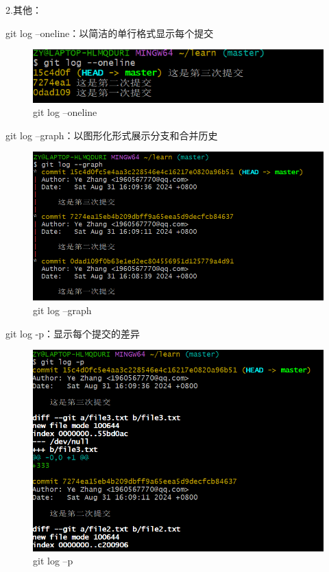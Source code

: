 \documentclass{ctexart}
\begin{document}
	2.其他：
	
	git log --oneline：以简洁的单行格式显示每个提交
	\begin{figure}[H]
		\centering
		\includegraphics{4}
		\caption{git log --oneline}
	\end{figure}
	
	git log --graph：以图形化形式展示分支和合并历史
	\begin{figure}[H]
		\centering
		\includegraphics[scale=0.5]{5}
		\caption{git log --graph}
	\end{figure}
	
	git log -p：显示每个提交的差异
	\begin{figure}[H]
		\centering
		\includegraphics[scale=0.5]{6}
		\caption{git log --p}
	\end{figure}
	
\end{document}

